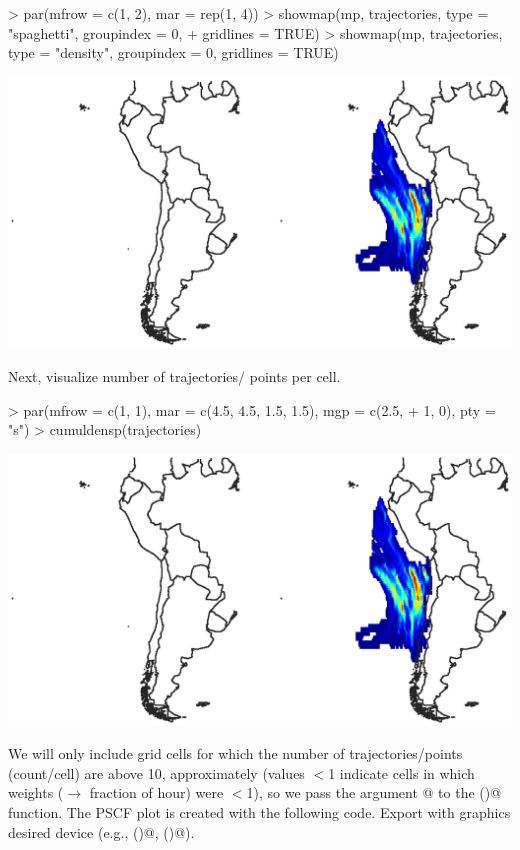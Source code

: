 \documentclass{article}
\renewenvironment{Schunk}{\vspace{\topsep}}{\vspace{\topsep}}
\begin{document}
\begin{Schunk}
\begin{Sinput}
> par(mfrow = c(1, 2), mar = rep(1, 4))
> showmap(mp, trajectories, type = "spaghetti", groupindex = 0, 
+     gridlines = TRUE)
> showmap(mp, trajectories, type = "density", groupindex = 0, gridlines = TRUE)
\end{Sinput}
\end{Schunk}
\includegraphics{figures/fig-015}

Next, visualize number of trajectories/ points per cell.

\begin{Schunk}
\begin{Sinput}
> par(mfrow = c(1, 1), mar = c(4.5, 4.5, 1.5, 1.5), mgp = c(2.5, 
+     1, 0), pty = "s")
> cumuldensp(trajectories)
\end{Sinput}
\end{Schunk}
\includegraphics{figures/fig-016}

We will only include grid cells for which the number of
trajectories/points (count/cell) are above 10, approximately (values
$<$1 indicate cells in which weights ($\to$ fraction of hour) were
$<$1), so we pass the argument @ to the
\verb@showmap()@ function. The PSCF plot is created with the following
code. Export with graphics desired device (e.g., \verb@pdf()@,
\verb@png()@).
\end{document}
